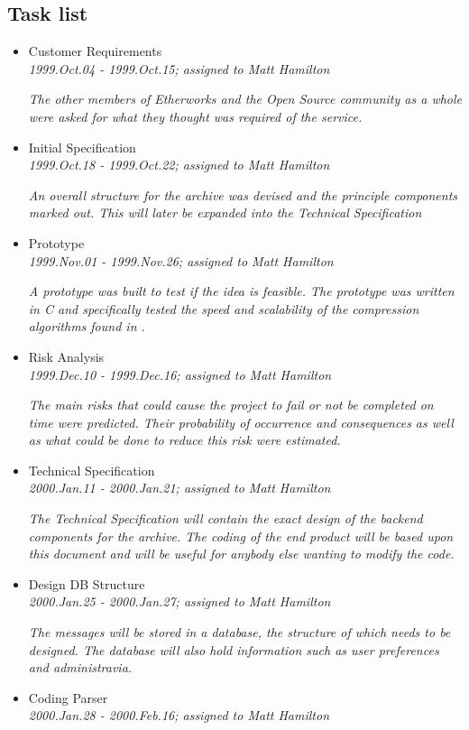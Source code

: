 \subsection{Task list}

\begin{itemize}
\item Customer Requirements\\{\em 1999.Oct.04 - 1999.Oct.15; assigned to Matt Hamilton}

{\em The other members of Etherworks and the Open Source community as a whole were asked for what they thought was required of the service.}
\item Initial Specification\\{\em 1999.Oct.18 - 1999.Oct.22; assigned to Matt Hamilton}

{\em An overall structure for the archive was devised and the principle components marked out.  This will later be expanded into the Technical Specification}
\item Prototype\\{\em 1999.Nov.01 - 1999.Nov.26; assigned to Matt Hamilton}

{\em A prototype was built to test if the idea is feasible.  The prototype was written in C and specifically tested the speed and scalability of the compression algorithms found in \cite{wmb:mg}.}
\item Risk Analysis\\{\em 1999.Dec.10 - 1999.Dec.16; assigned to Matt Hamilton}

{\em The main risks that could cause the project to fail or not be completed on time were predicted. Their probability of occurrence and consequences as well as what could be done to reduce this risk were estimated.}
\item Technical Specification\\{\em 2000.Jan.11 - 2000.Jan.21; assigned to Matt Hamilton}

{\em The Technical Specification will contain the exact design of the backend components for the archive.   The coding of the end product will be based upon this document and will be useful for anybody else wanting to modify the code.}
\item Design DB Structure\\{\em 2000.Jan.25 - 2000.Jan.27; assigned to Matt Hamilton}

{\em The messages will be stored in a database, the structure of which needs to be designed.  The database will also hold information such as user preferences and administravia.}
\item Coding Parser\\{\em 2000.Jan.28 - 2000.Feb.16; assigned to Matt Hamilton}


\end{itemize}
